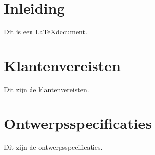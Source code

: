 \documentclass{article}
\begin{document}
\section{Inleiding}

Dit is een \LaTeX document.

\section{Klantenvereisten}

Dit zijn de klantenvereisten.

\section{Ontwerpsspecificaties}

Dit zijn de ontwerpsspecificaties.
\end{document}
